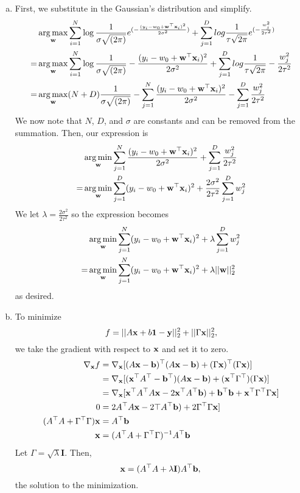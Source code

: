 \documentclass[12pt,letterpaper]{hmcpset}
\begin{document}
\begin{solution}
	\begin{enumerate}[(a)]
		\item
		First, we substitute in the Gaussian's distribution and simplify.
		\begin{align*}
			&\operatorname*{arg\,max}_{{\bf w}} \sum_{i=1}^N \log \frac{1}{\sigma \sqrt{(2 \pi)}} 
				e^{(-\frac{(y_i - w_0 + {\bf w}^\top{\bf x}_i)^2}{2\sigma^2})} 
				+ \sum_{j=1}^D log \frac{1}{\tau \sqrt{2\pi}} 
				e^{(-\frac{w_j^2}{2 \tau^2})} \\
			=&\operatorname*{arg\,max}_{{\bf w}} \sum_{i=1}^N \log \frac{1}{\sigma \sqrt{(2 \pi)}} 
			- \frac{(y_i - w_0 + {\bf w}^\top{\bf x}_i)^2}{2\sigma^2} 
			+ \sum_{j=1}^D log \frac{1}{\tau \sqrt{2\pi}} 
			- \frac{w_j^2}{2 \tau^2} \\
			=&\operatorname*{arg\,max}_{{\bf w}} (N + D) \frac{1}{\sigma \sqrt{(2 \pi)}} 
			- \sum_{j=1}^N \frac{(y_i - w_0 + {\bf w}^\top{\bf x}_i)^2}{2\sigma^2} 
			- \sum_{j=1}^D \frac{w_j^2}{2 \tau^2}
		\end{align*}
		We now note that $N$, $D$, and $\sigma$ are constants and can be removed from the summation. Then, our expression is
		\begin{align*}
			&\operatorname*{arg\,min}_{{\bf w}}
			 \sum_{j=1}^N \frac{(y_i - w_0 + {\bf w}^\top{\bf x}_i)^2}{2\sigma^2} 
			+ \sum_{j=1}^D \frac{w_j^2}{2 \tau^2}\\
			=&\operatorname*{arg\,min}_{{\bf w}}
			 \sum_{j=1}^D (y_i - w_0 + {\bf w}^\top{\bf x}_i)^2
			+ \frac{2\sigma^2}{2 \tau^2} \sum_{j=1}^D w_j^2
		\end{align*}
		We let $\lambda = \frac{2\sigma^2}{2 \tau^2}$ so the expression becomes
		\begin{align*}
			&\operatorname*{arg\,min}_{{\bf w}}
			 \sum_{j=1}^N (y_i - w_0 + {\bf w}^\top{\bf x}_i)^2
			+ \lambda \sum_{j=1}^D w_j^2 \\
			=&\operatorname*{arg\,min}_{{\bf w}}
			\sum_{j=1}^N (y_i - w_0 + {\bf w}^\top{\bf x}_i)^2
		   + \lambda ||{\bf w}||_2^2
		\end{align*}
		as desired.

		\item
		To minimize
		\[
			f = ||A{\bf x} + b{\bf 1} - {\bf y}||_2^2 + ||\Gamma{\bf x}||_2^2,
		\]
		we take the gradient with respect to ${\bf x}$ and set it to zero.
		\begin{align*}
			\nabla_{{\bf x}} f &= \nabla_{{\bf x}} [ (A{\bf x} - {\bf b})^\top (A{\bf x} - {\bf b}) 
			+(\Gamma {\bf x})^\top (\Gamma {\bf x})] \\
			&= \nabla_{{\bf x}} [ ({\bf x}^\top A^\top - {\bf b}^\top) (A{\bf x} - {\bf b}) 
			+({\bf x}^\top \Gamma^\top ) (\Gamma {\bf x}) ]\\
			&= \nabla_{{\bf x}} [ {\bf x}^\top A^\top A {\bf x} - 2{\bf x}^\top A^\top {\bf b}) 
			+ {\bf b}^\top {\bf b} + {\bf x}^\top \Gamma^\top \Gamma {\bf x} ]\\
			0 &= 2 A^\top A {\bf x} - 2\top A^\top {\bf b}) 
			+ 2 \Gamma^\top \Gamma {\bf x} ]\\
			(A^\top A + \Gamma^\top \Gamma) {\bf x} &= A^\top {\bf b} \\
			{\bf x} &= (A^\top A + \Gamma^\top \Gamma)^{-1} A^\top {\bf b} \\
		\end{align*}
		Let $\Gamma = \sqrt{\lambda} \mathbf{I}$. Then,
		\[
			{\bf x} = (A^\top A + \lambda \mathbf{I} )A^\top {\bf b}, \\
		\]
		the solution to the minimization.


\end{enumerate}
\end{solution}
\end{document}
